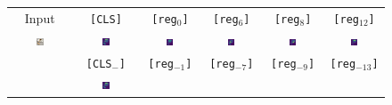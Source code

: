 \documentclass{article}
\begin{document}
\begin{figure}[t]
  \begin{tabular}{cccccc}
    Input & \texttt{[CLS]} & \texttt{[reg$_0$]} & \texttt{[reg$_6$]} & \texttt{[reg$_8$]} & \texttt{[reg$_{12}$]} \\
    \includegraphics[width=0.13\textwidth]{resources/230913_fig_slot_attn/mug.png} &
    \includegraphics[width=0.13\textwidth]{resources/230913_fig_slot_attn/mug_attn_cls.png} &
    \includegraphics[width=0.13\textwidth]{resources/230913_fig_slot_attn/mug_attn_reg_0.png} &
    \includegraphics[width=0.13\textwidth]{resources/230913_fig_slot_attn/mug_attn_reg_6.png} &
    \includegraphics[width=0.13\textwidth]{resources/230913_fig_slot_attn/mug_attn_reg_8.png} &
    \includegraphics[width=0.13\textwidth]{resources/230913_fig_slot_attn/mug_attn_reg_12.png} \\
    \midrule
     & \texttt{[CLS$_-$]} & \texttt{[reg$_{-1}$]} & \texttt{[reg$_{-7}$]} & \texttt{[reg$_{-9}$]} & \texttt{[reg$_{-13}$]} \\
     &
    \includegraphics[width=0.13\textwidth]{resources/230913_fig_slot_attn/mug_attn_cls_-.png} &

\end{tabular}
\end{figure}
\end{document}
